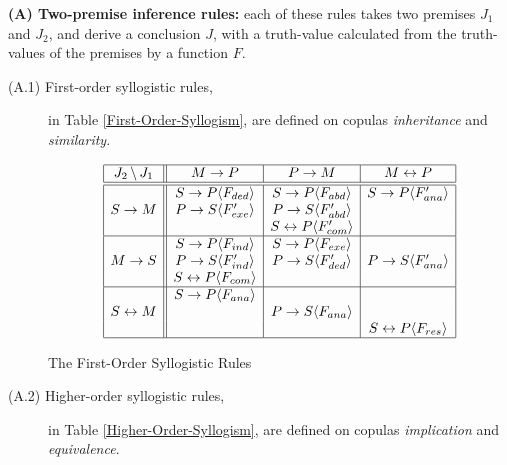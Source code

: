 \textbf{(A) Two-premise inference rules:} each of these rules takes two premises $J_1$ and $J_2$, and derive a conclusion $J$, with a truth-value calculated from the truth-values of the premises by a function $F$.
\begin{description}
	\item[(A.1) First-order syllogistic rules,] in Table \ref{First-Order-Syllogism}, are defined on copulas \emph{inheritance} and \emph{similarity}.

\begin{table}[htb]
\[\begin{array}{|c||c|c|c|} \hline
J_2 \, \backslash \, J_1 & M \rightarrow P & P \rightarrow M & M \leftrightarrow P \\
\hline \hline
                & S \rightarrow P \langle F_{ded}\rangle  & S \rightarrow P \langle F_{abd}\rangle  & S \rightarrow P \langle F'_{ana}\rangle  \\
S \rightarrow M & P \rightarrow S \langle F'_{exe}\rangle  & P \rightarrow S \langle F'_{abd}\rangle  &  \\
                & & S \leftrightarrow P \langle F'_{com}\rangle  &  \\
\hline
                & S \rightarrow P \langle F_{ind}\rangle  & S \rightarrow P \langle F_{exe}\rangle  & \\
M \rightarrow S & P \rightarrow S \langle F'_{ind}\rangle  & P \rightarrow S \langle F'_{ded}\rangle  & P \rightarrow S \langle F'_{ana}\rangle  \\
                & S \leftrightarrow P \langle F_{com}\rangle  &  &  \\
\hline
                    & S \rightarrow P \langle F_{ana}\rangle  &  &  \\
S \leftrightarrow M &  & P \rightarrow S \langle F_{ana}\rangle  &  \\
                    &  &  & S \leftrightarrow P \langle F_{res}\rangle  \\
\hline \end{array}\]
\caption{The First-Order Syllogistic Rules}
\label{First-Order-Syllogism}
\end{table}

  \item[(A.2) Higher-order syllogistic rules,]  in Table \ref{Higher-Order-Syllogism}, are defined on copulas \emph{implication} and \emph{equivalence}.


\end{description}
